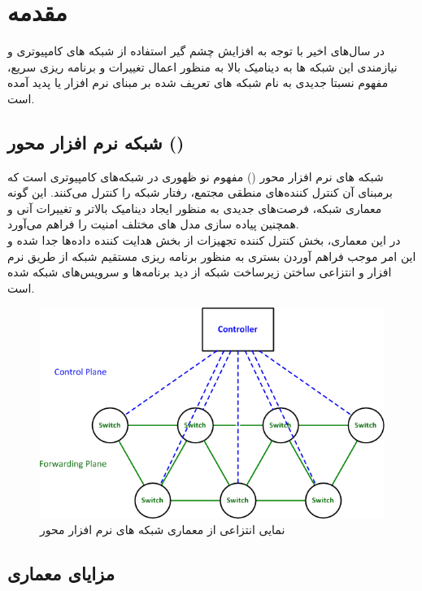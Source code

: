 \chapter{مقدمه}
در سال‌های اخیر با توجه به افزایش چشم گیر استفاده از شبکه های کامپیوتری و نیازمندی این شبکه ها به دینامیک بالا به منظور اعمال تغییرات و برنامه ریزی سریع، مفهوم نسبتا جدیدی به نام شبکه های تعریف شده بر مبنای نرم افزار یا  پدید آمده است.

\section{شبکه نرم افزار محور ()}
شبکه های نرم افزار محور () مفهوم نو ظهوری در شبکه‌های کامپیوتری است که برمبنای آن کنترل کننده‌های منطقی مجتمع، رفتار شبکه را کنترل می‌کنند. این گونه معماری شبکه، فرصت‌های جدیدی به منظور ایجاد دینامیک بالاتر و تغییرات آنی و همچنین پیاده سازی مدل های مختلف امنیت را فراهم می‌آورد.\\
در این معماری، بخش کنترل کننده تجهیزات از بخش هدایت کننده داده‌ها جدا شده و این امر موجب فراهم آوردن بستری به منظور برنامه ریزی مستقیم شبکه از طریق نرم افزار و انتزاعی ساختن زیرساخت شبکه از دید برنامه‌ها و سرویس‌های شبکه شده است.

\begin{figure}
	\centering
	\includegraphics[scale=0.5]{imgs/SDN_controller.png}
	\caption{نمایی انتزاعی از معماری شبکه های نرم افزار محور}
	\label{fig1}
\end{figure}

\section{مزایای معماری }


